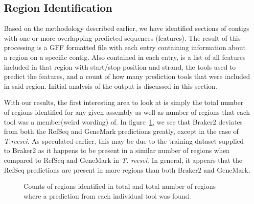 \subsection{Region Identification}

Based on the methodology described earlier, we have identified
sections of contigs with one or more overlapping predicted sequences
(features). The result of this processing is a GFF formatted file with
each entry containing information about a region on a specific
contig. Also contained in each entry, is a list of all features
included in that region with start/stop position and strand, the tools
used to predict the features, and a count of how many prediction tools
that were included in said region. Initial analysis of the output is
discussed in this section.

With our results, the first interesting area to look at is simply the
total number of regions identified for any given assembly as well as
number of regions that each tool was a member(weird wording) of. In
figure~\ref{regioncounts}, we see that Braker2 deviates from both the
RefSeq and GeneMark predictions greatly, except in the case of
\textit{T.reesei}. As speculated earlier, this may be due to the
training dataset supplied to Braker2 as it happens to be present in a
similar number of regions when compared to RefSeq and GeneMark in
\textit{T. reesei}. In general, it appears that the RefSeq predictions
are present in more regions than both Braker2 and GeneMark. 

\begin{figure}
  \caption{Counts of regions identified in total and total number of
    regions where a prediction from each individual tool was found.}
  \label{regioncounts}
\end{figure}

